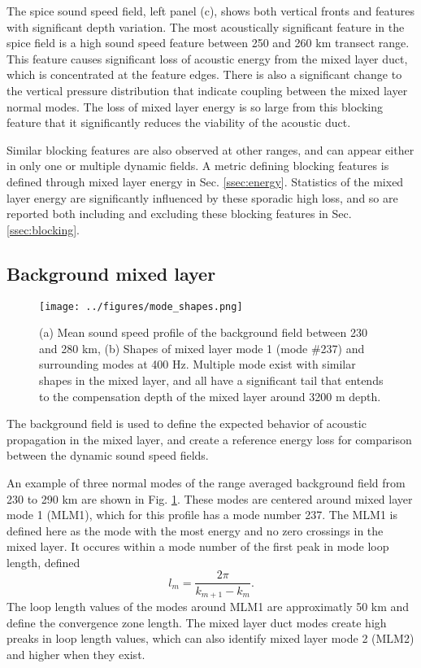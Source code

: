 \documentclass[preprint,NumberedRefs]{JASA}
\begin{document}
The spice sound speed field, left panel (c), shows both vertical fronts and features with significant depth variation. The most acoustically significant feature in the spice field is a high sound speed feature between 250 and 260 km transect range. This feature causes significant loss of acoustic energy from the mixed layer duct, which is concentrated at the feature edges. There is also a significant change to the vertical pressure distribution that indicate coupling between the mixed layer normal modes. The loss of mixed layer energy is so large from this blocking feature that it significantly reduces the viability of the acoustic duct.

Similar blocking features are also observed at other ranges, and can appear either in only one or multiple dynamic fields. A metric defining blocking features is defined through mixed layer energy in Sec. \ref{ssec:energy}. Statistics of the mixed layer energy are significantly influenced by these sporadic high loss, and so are reported both including and excluding these blocking features in Sec. \ref{ssec:blocking}.

\subsection{Background mixed layer}\label{ssec:bg}
\begin{figure}
\texttt{[image: ../figures/mode\_shapes.png]}
    \caption{\label{fig:bg_modes}{(a) Mean sound speed profile of the background field between 230 and 280 km, (b) Shapes of mixed layer mode 1 (mode \#237) and surrounding modes at 400 Hz. Multiple mode exist with similar shapes in the mixed layer, and all have a significant tail that entends to the compensation depth of the mixed layer around 3200 m depth.}}
\end{figure}
The background field is used to define the expected behavior of acoustic propagation in the mixed layer, and create a reference energy loss for comparison between the dynamic sound speed fields.

An example of three normal modes of the range averaged background field from 230 to 290 km are shown in Fig. \ref{fig:bg_modes}. These modes are centered around mixed layer mode 1 (MLM1), which for this profile has a mode number 237. The MLM1 is defined here as the mode with the most energy and no zero crossings in the mixed layer. It occures within a mode number of the first peak in mode loop length\citep{jensen2011computational}, defined
\begin{equation}
    l_{m} = \frac{2 \pi}{k_{m+1} - k_m}.
    \label{eq:loop_length}
\end{equation}
The loop length values of the modes around MLM1 are approximatly 50 km and define the convergence zone length. The mixed layer duct modes create high preaks in loop length values, which can also identify mixed layer mode 2 (MLM2) and higher when they exist.
\end{document}
